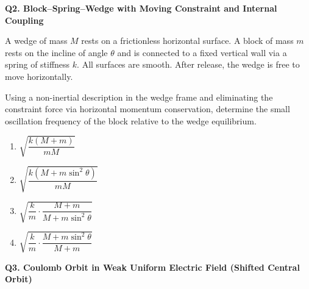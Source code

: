 \documentclass[12pt]{article}
\begin{document}
\textbf{Q2. Block–Spring–Wedge with Moving Constraint and Internal Coupling}



A wedge of mass $M$ rests on a frictionless horizontal surface. A block of mass $m$ rests on the incline of angle $\theta$ and is connected to a fixed vertical wall via a spring of stiffness $k$. All surfaces are smooth. After release, the wedge is free to move horizontally.

Using a non-inertial description in the wedge frame and eliminating the constraint force via horizontal momentum conservation, determine the small oscillation frequency of the block relative to the wedge equilibrium.

\begin{center}
\end{center}
\begin{enumerate}
\item[(A)] $\sqrt{\dfrac{k(M+m)}{mM}}$
\item[(B)] $\sqrt{\dfrac{k(M+m\sin^2\theta)}{mM}}$
\item[(C)] $\sqrt{\dfrac{k}{m} \cdot \dfrac{M+m}{M+m\sin^2\theta}}$
\item[(D)] $\sqrt{\dfrac{k}{m} \cdot \dfrac{M+m\sin^2\theta}{M+m}}$
\end{enumerate}

\textbf{Q3. Coulomb Orbit in Weak Uniform Electric Field (Shifted Central Orbit)}
\end{document}
